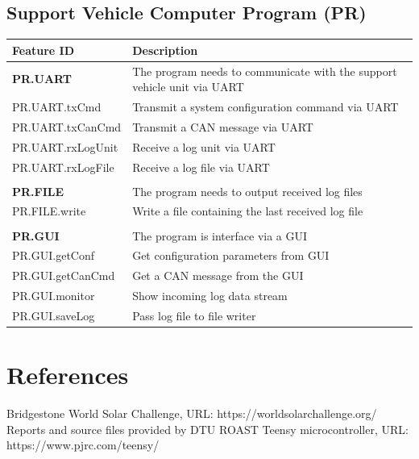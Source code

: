 \documentclass[]{article}
\begin{document}
\subsection{Support Vehicle Computer Program (PR)}
\begin{table}[H]
    \centering
    \begin{tabular}{|l|l|}
    \hline
        \textbf{Feature ID} & \textbf{Description} \\ \hline
        \textbf{PR.UART} & The program needs to communicate with the support vehicle unit via UART \\ \hline
        PR.UART.txCmd & Transmit a system configuration command via UART \\ \hline
        PR.UART.txCanCmd & Transmit a CAN message via UART \\ \hline
        PR.UART.rxLogUnit & Receive a log unit via UART \\ \hline
        PR.UART.rxLogFile & Receive a log file via UART \\ \hline
         &  \\ \hline
        \textbf{PR.FILE} & The program needs to output received log files \\ \hline
        PR.FILE.write & Write a file containing the last received log file \\ \hline
         &  \\ \hline
        \textbf{PR.GUI} & The program is interface via a GUI \\ \hline
        PR.GUI.getConf & Get configuration parameters from GUI \\ \hline
        PR.GUI.getCanCmd & Get a CAN message from the GUI \\ \hline
        PR.GUI.monitor & Show incoming log data stream \\ \hline
        PR.GUI.saveLog & Pass log file to file writer \\ \hline
    \end{tabular}
\end{table}

\section{References}
\begingroup
\renewcommand{\section}[2]{}%
\begin{thebibliography}{}
Bridgestone World Solar Challenge, 
URL: https://worldsolarchallenge.org/
Reports and source files provided by DTU ROAST
Teensy microcontroller,
URL: https://www.pjrc.com/teensy/
\end{thebibliography}
\endgroup
\end{document}
